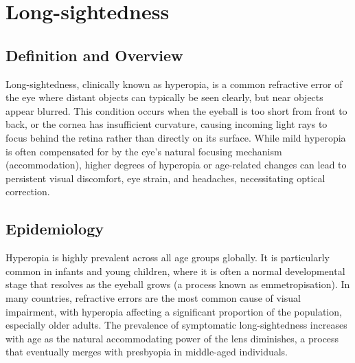 \chapter{Long-sightedness}

\section*{Definition and Overview}
Long-sightedness, clinically known as hyperopia, is a common refractive error of the eye where distant objects can typically be seen clearly, but near objects appear blurred. This condition occurs when the eyeball is too short from front to back, or the cornea has insufficient curvature, causing incoming light rays to focus behind the retina rather than directly on its surface. While mild hyperopia is often compensated for by the eye's natural focusing mechanism (accommodation), higher degrees of hyperopia or age-related changes can lead to persistent visual discomfort, eye strain, and headaches, necessitating optical correction.

\section*{Epidemiology}
Hyperopia is highly prevalent across all age groups globally. It is particularly common in infants and young children, where it is often a normal developmental stage that resolves as the eyeball grows (a process known as emmetropisation). In many countries, refractive errors are the most common cause of visual impairment, with hyperopia affecting a significant proportion of the population, especially older adults. The prevalence of symptomatic long-sightedness increases with age as the natural accommodating power of the lens diminishes, a process that eventually merges with presbyopia in middle-aged individuals.

